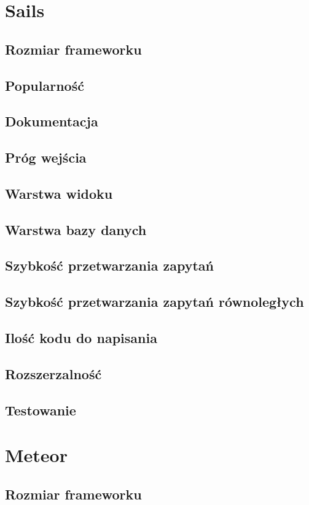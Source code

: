 \documentclass[12pt]{report}
\begin{document}
  \section{Sails}
    \subsection{Rozmiar frameworku}
    \subsection{Popularność}
    \subsection{Dokumentacja}
    \subsection{Próg wejścia}
    \subsection{Warstwa widoku}
    \subsection{Warstwa bazy danych}
    \subsection{Szybkość przetwarzania zapytań}
    \subsection{Szybkość przetwarzania zapytań równoległych}
    \subsection{Ilość kodu do napisania}
    \subsection{Rozszerzalność}
    \subsection{Testowanie}

  \section{Meteor}
    \subsection{Rozmiar frameworku}
\end{document}
